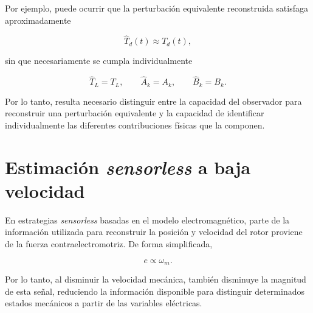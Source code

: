 Por ejemplo, puede ocurrir que la perturbación equivalente reconstruida 
satisfaga aproximadamente

\begin{equation}
\hat{T}_d(t)
\approx
T_d(t),
\end{equation}

sin que necesariamente se cumpla individualmente

\begin{equation}
\hat{T}_L=T_L,
\qquad
\hat{A}_k=A_k,
\qquad
\hat{B}_k=B_k.
\end{equation}

Por lo tanto, resulta necesario distinguir entre la capacidad del observador 
para reconstruir una perturbación equivalente y la capacidad de identificar 
individualmente las diferentes contribuciones físicas que la componen.

%



\section{Estimación \textit{sensorless} a baja velocidad}

%
%
%
%

En estrategias \textit{sensorless} basadas en el modelo electromagnético, 
parte de la información utilizada para reconstruir la posición y velocidad 
del rotor proviene de la fuerza contraelectromotriz. De forma simplificada,

\begin{equation}
e \propto \omega_m.
\end{equation}

Por lo tanto, al disminuir la velocidad mecánica, también disminuye la 
magnitud de esta señal, reduciendo la información disponible para distinguir 
determinados estados mecánicos a partir de las variables eléctricas.

